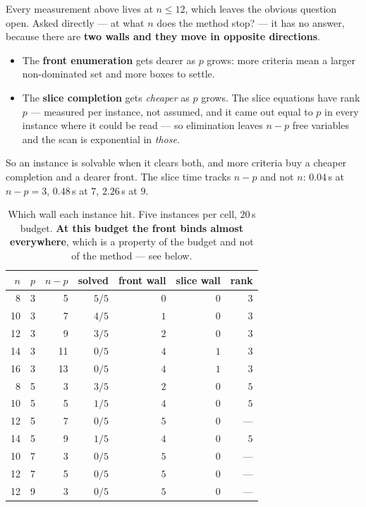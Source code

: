 \documentclass[11pt,a4paper]{article}
\begin{document}
Every measurement above lives at $n \leqslant 12$, which leaves the obvious
question open.  Asked directly --- at what $n$ does the method stop? --- it has
no answer, because there are \textbf{two walls and they move in opposite
directions}.

\begin{itemize}
\item The \textbf{front enumeration} gets dearer as $p$ grows: more criteria
      mean a larger non-dominated set and more boxes to settle.
\item The \textbf{slice completion} gets \emph{cheaper} as $p$ grows.  The
      slice equations have rank $p$ --- measured per instance, not assumed, and
      it came out equal to $p$ in every instance where it could be read --- so
      elimination leaves $n - p$ free variables and the scan is exponential in
      \emph{those}.
\end{itemize}

\noindent
So an instance is solvable when it clears both, and more criteria buy a cheaper
completion and a dearer front.  The slice time tracks $n-p$ and not $n$:
$0.04$\,s at $n-p=3$, $0.48$\,s at $7$, $2.26$\,s at $9$.

\begin{table}[h]
\centering
\caption{Which wall each instance hit.  Five instances per cell, $20$\,s
budget.  \textbf{At this budget the front binds almost everywhere}, which is a
property of the budget and not of the method --- see below.}
\label{tab:walls}
\small
\begin{tabular}{rrrrrrr}
\toprule
$n$ & $p$ & $n-p$ & solved & front wall & slice wall & rank \\
\midrule
 8 & 3 &  5 & $5/5$ & $0$ & $0$ & $3$ \\
10 & 3 &  7 & $4/5$ & $1$ & $0$ & $3$ \\
12 & 3 &  9 & $3/5$ & $2$ & $0$ & $3$ \\
14 & 3 & 11 & $0/5$ & $4$ & $1$ & $3$ \\
16 & 3 & 13 & $0/5$ & $4$ & $1$ & $3$ \\
\midrule
 8 & 5 &  3 & $3/5$ & $2$ & $0$ & $5$ \\
10 & 5 &  5 & $1/5$ & $4$ & $0$ & $5$ \\
12 & 5 &  7 & $0/5$ & $5$ & $0$ & --- \\
14 & 5 &  9 & $1/5$ & $4$ & $0$ & $5$ \\
\midrule
10 & 7 &  3 & $0/5$ & $5$ & $0$ & --- \\
12 & 7 &  5 & $0/5$ & $5$ & $0$ & --- \\
12 & 9 &  3 & $0/5$ & $5$ & $0$ & --- \\
\bottomrule
\end{tabular}
\end{table}
\end{document}
